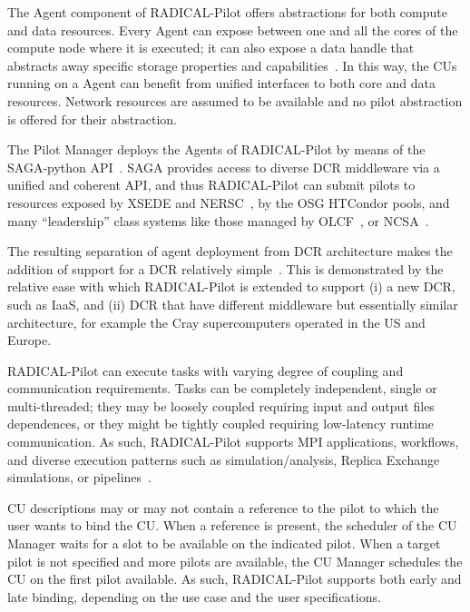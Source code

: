 \documentclass{sig-alternate}
\begin{document}


The Agent component of RADICAL-Pilot offers abstractions for both compute and
data resources. Every Agent can expose between one and all the cores of the
compute node where it is executed; it can also expose a data handle that
abstracts away specific storage properties and capabilities~\cite{luckow2010}.
In this way, the CUs running on a Agent can benefit from unified interfaces to
both core and data resources. Network resources are assumed to be available and
no pilot abstraction is offered for their abstraction.

The Pilot Manager deploys the Agents of RADICAL-Pilot by means of the
SAGA-python API~\cite{merzky2015saga}. SAGA provides access to diverse DCR
middleware via a unified and coherent API, and thus RADICAL-Pilot can submit
pilots to resources exposed by XSEDE and NERSC~\cite{nersc_url}, by the OSG
HTCondor pools, and many ``leadership'' class systems like those managed by
OLCF~\cite{olcf_url}, or NCSA~\cite{ncsa_url}.

The resulting separation of agent deployment from DCR architecture makes the
addition of support for a DCR relatively simple~\cite{merzky2015radical}. This is
demonstrated by the relative ease with which RADICAL-Pilot is extended to
support (i) a new DCR, such as IaaS, and (ii) DCR that have different middleware
but essentially similar architecture, for example the Cray supercomputers
operated in the US and Europe.

RADICAL-Pilot can execute tasks with varying degree of coupling and
communication requirements. Tasks can be completely independent, single or
multi-threaded; they may be loosely coupled requiring input and output files
dependences, or they might be tightly coupled requiring low-latency runtime
communication. As such, RADICAL-Pilot supports MPI applications, workflows, and
diverse execution patterns such as simulation/analysis, Replica Exchange
simulations, or pipelines~\cite{emdtoolkit_url}.

CU descriptions may or may not contain a reference to the pilot to which the
user wants to bind the CU. When a reference is present, the scheduler of the CU
Manager waits for a slot to be available on the indicated pilot. When a target
pilot is not specified and more pilots are available, the CU Manager schedules
the CU on the first pilot available. As such, RADICAL-Pilot supports both early
and late binding, depending on the use case and the user specifications.
\end{document}
